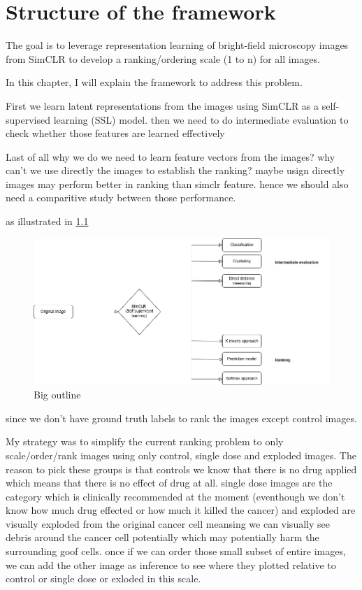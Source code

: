 \chapter{Structure of the framework}\label{ch: Structure of the framework}

The goal is to leverage representation learning of bright-field microscopy images from SimCLR to develop a ranking/ordering scale (1 to n)
for all images. 

In this chapter, I will explain the framework to address this problem. 

First we learn latent representations from the images using SimCLR as a self-supervised learning (SSL) model.
then we need to do intermediate evaluation to check whether those features are learned effectively 



Last of all why we do we need to learn feature vectors from the images? why can't we use directly the images to establish the ranking? maybe usign directly
images may perform better in ranking than simclr feature. hence we should also need a comparitive study between those performance.


as illustrated in \ref{fig:BigOutline}

\begin{figure}[H]
  \centering
  \includegraphics[scale=0.46]{figures/BigOutline.drawio.png} 
  \caption{Big outline}
  \label{fig:BigOutline}
\end{figure}
 
 
 
 
 
 
 since we don't have ground truth labels to rank the images except control images.



My strategy was to simplify the current ranking problem to
 only scale/order/rank images 
using only control, single dose and exploded images.
The reason to pick these groups is that controls we know that there is no drug applied which means that there is no effect of drug at all. 
single dose images are the category which is clinically recommended at the moment (eventhough we don't know how much drug effected or how 
much it killed the cancer) 
and exploded are visually exploded from the original cancer cell meansing we can visually see debris around the cancer cell potentially which
 may potentially harm the surrounding goof cells.
once if we can order those small subset of entire images, we can add the other image as inference to see where they plotted relative to 
control 
or single dose or exloded in this scale.


